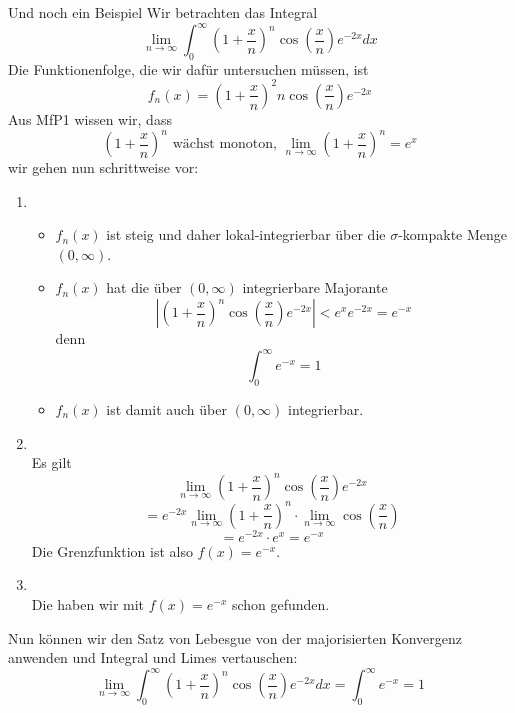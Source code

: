 \begin{Beispiel}{Und noch ein Beispiel}
Wir betrachten das Integral
$$\lim_{n\rightarrow \infty}\int_0^\infty (1+\frac{x}{n})^n\cos(\frac{x}{n})e^{-2x}dx$$
Die Funktionenfolge, die wir dafür untersuchen müssen, ist
$$f_n(x)=(1+\frac{x}{n})^2n\cos(\frac{x}{n})e^{-2x}$$
Aus MfP1 wissen wir, dass
$$(1+\frac{x}{n})^n \mbox{ wächst monoton, } \lim_{n\rightarrow \infty}(1+\frac{x}{n})^n=e^x$$
wir gehen nun schrittweise vor: \begin{enumerate}
    \item {} \\
    \begin{itemize}
        \item $f_n(x)$ ist steig und daher lokal-integrierbar über die $\sigma$-kompakte Menge $(0,\infty)$.
        \item $f_n(x)$ hat die über $(0,\infty)$ integrierbare Majorante
        $$|(1+\frac{x}{n})^n\cos(\frac{x}{n})e^{-2x}|<e^xe^{-2x}=e^{-x}$$
        denn $$\int_0^\infty e^{-x}= 1$$
        \item $f_n(x)$ ist damit auch über $(0,\infty)$ integrierbar.
    \end{itemize}
    \item {} \\
    Es gilt $$\lim_{n\rightarrow \infty} (1+\frac{x}{n})^n\cos(\frac{x}{n})e^{-2x}$$
    $$=e^{-2x}\lim_{n\rightarrow \infty} (1+\frac{x}{n})^n \cdot \lim_{n\rightarrow \infty} \cos(\frac{x}{n})$$
    $$=e^{-2x}\cdot e^x=e^{-x}$$
    Die Grenzfunktion ist also $f(x)=e^{-x}$.
    \item {} \\
    Die haben wir mit $f(x)=e^{-x}$ schon gefunden.
\end{enumerate}
Nun können wir den Satz von Lebesgue von der majorisierten Konvergenz anwenden und Integral und Limes vertauschen:
$$\lim_{n\rightarrow \infty} \int_0^\infty (1+\frac{x}{n})^n\cos(\frac{x}{n})e^{-2x}dx = \int_0^\infty e^{-x} = 1$$
\end{Beispiel}
\newpage
